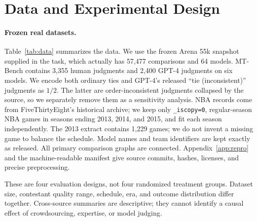 \documentclass{article}
\begin{document}
\section{Data and Experimental Design}
\begin{table}[t]
\caption{Primary data after deterministic preprocessing. Exposure counts each contestant's incident records. All Arena rows and all released MT judgments are retained in the primary fits. Clusters are records for Arena, questions for MT, and game dates for NBA.}
\label{tab:data}
\centering\small
\end{table}

\paragraph{Frozen real datasets.}
Table~\ref{tab:data} summarizes the data. We use the frozen Arena 55k snapshot supplied in the task, which actually has 57,477 comparisons and 64 models. MT-Bench contains 3,355 human judgments and 2,400 GPT-4 judgments on six models. We encode both ordinary ties and GPT-4's released ``tie (inconsistent)'' judgments as $1/2$. The latter are order-inconsistent judgments collapsed by the source, so we separately remove them as a sensitivity analysis. NBA records come from FiveThirtyEight's historical archive; we keep only \texttt{\_iscopy=0}, regular-season NBA games in seasons ending 2013, 2014, and 2015, and fit each season independently. The 2013 extract contains 1,229 games; we do not invent a missing game to balance the schedule. Model names and team identifiers are kept exactly as released. All primary comparison graphs are connected. Appendix~\ref{app:repro} and the machine-readable manifest give source commits, hashes, licenses, and precise preprocessing.

These are four evaluation designs, not four randomized treatment groups. Dataset size, contestant quality range, schedule, era, and outcome distribution differ together. Cross-source summaries are descriptive; they cannot identify a causal effect of crowdsourcing, expertise, or model judging.
\end{document}
